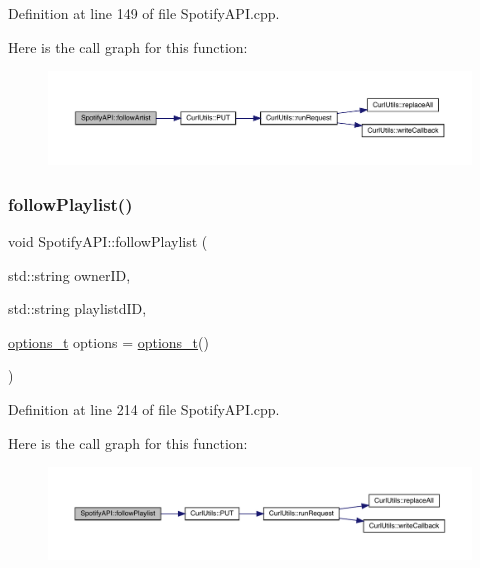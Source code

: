Definition at line 149 of file Spotify\+A\+P\+I.\+cpp.

Here is the call graph for this function\+:
\nopagebreak
\begin{figure}[H]
\begin{center}
\leavevmode
\includegraphics[width=350pt]{class_spotify_a_p_i_ae8eaa0d40f4a07af6354fac9f0452d47_cgraph}
\end{center}
\end{figure}
\mbox{\label{class_spotify_a_p_i_abc2a6bac621bfc0e2301147a63d325e1}} 
\subsubsection{\texorpdfstring{follow\+Playlist()}{followPlaylist()}}
{\footnotesize\ttfamily void Spotify\+A\+P\+I\+::follow\+Playlist (\begin{DoxyParamCaption}\item[{std\+::string}]{owner\+ID,  }\item[{std\+::string}]{playlistd\+ID,  }\item[{\mbox{\hyperlink{_spotify_a_p_i_8h_a0ff5cac1a4007bb330b7d9939650c283}{options\+\_\+t}}}]{options = {\ttfamily \mbox{\hyperlink{_spotify_a_p_i_8h_a0ff5cac1a4007bb330b7d9939650c283}{options\+\_\+t}}()} }\end{DoxyParamCaption})}



Definition at line 214 of file Spotify\+A\+P\+I.\+cpp.

Here is the call graph for this function\+:
\nopagebreak
\begin{figure}[H]
\begin{center}
\leavevmode
\includegraphics[width=350pt]{class_spotify_a_p_i_abc2a6bac621bfc0e2301147a63d325e1_cgraph}
\end{center}
\end{figure}
\mbox{\label{class_spotify_a_p_i_a9b47427d58da9c870860bf066430cb35}} 
